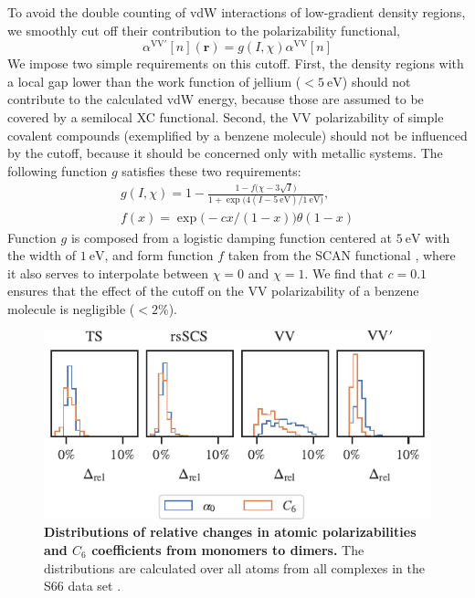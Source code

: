 To avoid the double counting of vdW interactions of low-gradient density regions, we smoothly cut off their contribution to the polarizability functional,
\begin{equation}
  \alpha^\mathrm{VV'}[n](\mathbf r)=g(I,\chi)\alpha^\text{VV}[n]
\end{equation}
We impose two simple requirements on this cutoff.
First, the density regions with a local gap lower than the work function of jellium ($<\SI{5}{\electronvolt}$) should not contribute to the calculated vdW energy, because those are assumed to be covered by a semilocal XC functional.
Second, the VV polarizability of simple covalent compounds (exemplified by a benzene molecule) should not be influenced by the cutoff, because it should be concerned only with metallic systems.
The following function $g$ satisfies these two requirements:
\begin{equation}
\begin{gathered}
  g(I,\chi)=1-\frac{1-f\bigl(\chi-3\sqrt{I}\bigr)}{1+\exp\bigl(4(I-\SI{5}{\electronvolt})/\SI{1}{\electronvolt}\bigr)}, \\
  f(x)=\exp\bigl(-cx/(1-x)\bigr)\theta(1-x)
\end{gathered}
\end{equation}
Function $g$ is composed from a logistic damping function centered at $\SI{5}{\electronvolt}$ with the width of $\SI{1}{\electronvolt}$, and form function $f$ taken from the SCAN functional \citep{SunPRL15}, where it also serves to interpolate between $\chi=0$ and $\chi=1$.
We find that $c=0.1$ ensures that the effect of the cutoff on the VV polarizability of a benzene molecule is negligible ($<2\%$).

\begin{figure}[t!]
\centering
\includegraphics{../media/pol-shifts.pdf}
\caption{\textbf{Distributions of relative changes in atomic polarizabilities and $C_6$ coefficients from monomers to dimers.}
The distributions are calculated over all atoms from all complexes in the S66 data set \citep{RezacJCTC11}.
}\label{fig:pol-shifts}
\end{figure}

